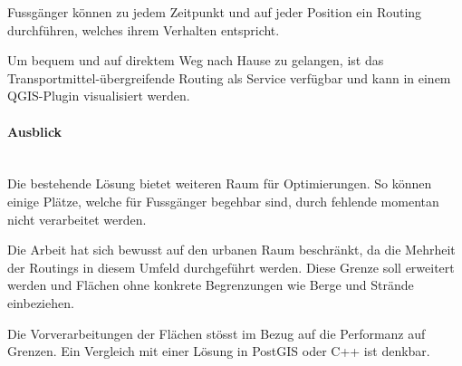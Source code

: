 Fussgänger können zu jedem Zeitpunkt und auf jeder Position ein Routing durchführen, welches ihrem Verhalten entspricht.


Um bequem und auf direktem Weg nach Hause zu gelangen, ist das Transportmittel-übergreifende Routing als Service verfügbar und kann in einem QGIS-Plugin visualisiert werden.


\paragraph{Ausblick}~\\
Die bestehende Lösung bietet weiteren Raum für Optimierungen. So können einige Plätze, welche für Fussgänger begehbar sind, durch fehlende  momentan nicht verarbeitet werden.

Die Arbeit hat sich bewusst auf den urbanen Raum beschränkt, da die Mehrheit der Routings in diesem Umfeld durchgeführt werden. Diese Grenze soll erweitert werden und Flächen ohne konkrete Begrenzungen wie Berge und Strände einbeziehen.

Die Vorverarbeitungen der Flächen stösst im Bezug auf die Performanz auf Grenzen. Ein Vergleich mit einer Lösung in PostGIS oder C++ ist denkbar.